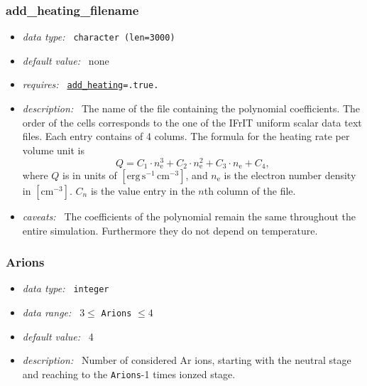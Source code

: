 \documentclass[a4paper,10pt]{article}
\begin{document}
\subsubsection{add\_heating\_filename}
\label{opt:addheatingfilename}
\begin{itemize}
 \item \textit{data type:~} \texttt{character (len=3000)}
 \item \textit{default value:~} none
 \item \textit{requires:~} 
  \texttt{\hyperref[opt:addheating]{add\_heating}=.true.}
 \item \textit{description:~} The name of the file containing the polynomial
  coefficients. The order of the cells corresponds to the one of the IFrIT
  uniform scalar data text files.
  Each entry contains of 4 colums.
  The formula for the heating rate per volume unit is
  \begin{equation}
  Q=  C_1 \cdot n_\mathrm{e}^3 +C_2 \cdot n_\mathrm{e}^2 +C_3 \cdot n_\mathrm{e}
     +C_4, 
  \end{equation}
  where $Q$ is in units of $\mathrm{\left[erg\,s^{-1}\,cm^{-3}\right]}$,
  and $n_\mathrm{e}$ is the electron number density in 
  $\mathrm{\left[cm^{-3}\right]}$. $C_n$ is the value entry in the $n$th column
  of the file.
 \item \textit{caveats:~} The coefficients of the polynomial remain the same
  throughout the entire simulation. Furthermore they do not depend on 
  temperature.
\end{itemize}

\subsubsection{Arions}
\label{opt:arions}
\begin{itemize}
 \item \textit{data type:~} \texttt{integer}
 \item \textit{data range:~}  $3 \leq$ \texttt{Arions} $\leq 4$ 
 \item \textit{default value:~} 4
 \item \textit{description:~} Number of considered Ar ions, starting with the 
 neutral stage and reaching to  the \texttt{Arions}-1 times ionzed stage.
\end{itemize}
\end{document}
